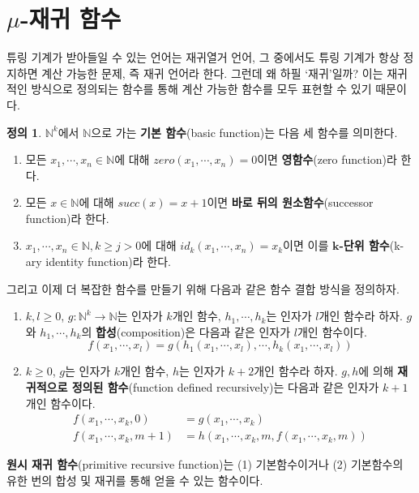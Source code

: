 \documentclass[b5paper]{book}
\theoremstyle{definition}
\newtheorem{defn}{정의}[chapter]
\begin{document}
\section{$\mu$-재귀 함수} \label{mu-recursive}
튜링 기계가 받아들일 수 있는 언어는 재귀열거 언어, 그 중에서도 튜링 기계가 항상 정지하면 계산 가능한 문제, 즉 재귀 언어라 한다. 
그런데 왜 하필 `재귀'일까? 이는 재귀적인 방식으로 정의되는 함수를 통해 계산 가능한 함수를 모두 표현할 수 있기
때문이다.  
\begin{defn}
    $\mathbb{N}^k$에서 $\mathbb{N}$으로 가는 \textbf{기본 함수}(basic function)는 다음 세 함수를 의미한다.
    \begin{enumerate}
        \item 모든 $x_1, \cdots, x_n \in \mathbb{N}$에 대해 
        $zero(x_1, \cdots, x_n) = 0$이면 \textbf{영함수}(zero function)라 한다.
        \item 모든 $x \in \mathbb{N}$에 대해 $succ(x) = x+1$이면 \textbf{바로 뒤의 원소함수}(successor
        function)라 한다. 
        \item $x_1, \cdots, x_n \in \mathbb{N}, k \ge j > 0$에 대해 $id_k(x_1, \cdots, x_n) = x_k$이면 이를 
        $\mathbf{k}$\textbf{-단위 함수}(k-ary identity function)라 한다. 
    \end{enumerate}
    그리고 이제 더 복잡한 함수를 만들기 위해 다음과 같은 함수 결합 방식을 정의하자.
    \begin{enumerate}
        \item $k, l \ge 0$, $g: \mathbb{N}^k \rightarrow \mathbb{N}$는 인자가 $k$개인 함수, $h_1, \cdots, h_k$는
        인자가 $l$개인 함수라 하자. $g$와 $h_1, \cdots, h_k$의 \textbf{합성}(composition)은 
        다음과 같은 인자가 $l$개인 함수이다.
        $$f(x_1, \cdots , x_l) = g(h_1(x_1, \cdots , x_l), \cdots, h_k(x_1, \cdots, x_l))$$
        \item $k \ge 0$, $g$는 인자가 $k$개인 함수, $h$는 인자가 $k+2$개인 함수라 하자. $g, h$에 의해 
        \textbf{재귀적으로 정의된 함수}(function defined recursively)는 다음과 같은 인자가 $k+1$개인 함수이다.
        \begin{align*}
            f(x_1, \cdots, x_k, 0) &= g(x_1, \cdots, x_k) \\ 
            f(x_1, \cdots, x_k, m+1) &= h(x_1, \cdots, x_k, m, f(x_1, \cdots, x_k, m))
        \end{align*} 
    \end{enumerate}
    \textbf{원시 재귀 함수}(primitive recursive function)는 (1) 기본함수이거나 (2) 기본함수의 
    유한 번의 합성 및 재귀를 통해 얻을 수 있는 함수이다.
\end{defn}
\end{document}
